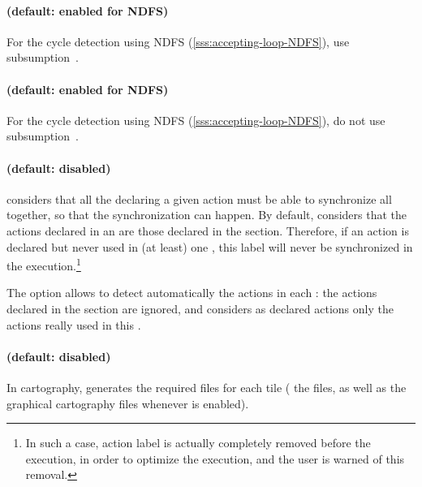 \paragraph{ (default: enabled for NDFS)}
For the cycle detection using NDFS (\cref{sss:accepting-loop-NDFS}), use subsumption~\cite{NPP18}.


\paragraph{ (default: enabled for NDFS)}
For the cycle detection using NDFS (\cref{sss:accepting-loop-NDFS}), do not use subsumption~\cite{NPP18}.


\paragraph{ (default: disabled)}
\imitator{} considers that all the \IPTA{} declaring a given action must be able to synchronize all together, so that the synchronization can happen.
By default, \imitator{} considers that the actions declared in an \IPTA{} are those declared in the  section.
Therefore, if an action is declared but never used in (at least) one \IPTA{}, this label will never be synchronized in the execution.\footnote{In such a case, action label is actually completely removed before the execution, in order to optimize the execution, and the user is warned of this removal.}

The option  allows to detect automatically the actions in each \IPTA{}: the actions declared in the  section are ignored, and \imitator{} considers as declared actions only the actions really used in this \IPTA{}.



\paragraph{ (default: disabled)}
In cartography, generates the required files for each tile (\ie{} the  files, as well as the graphical cartography files whenever  is enabled).



